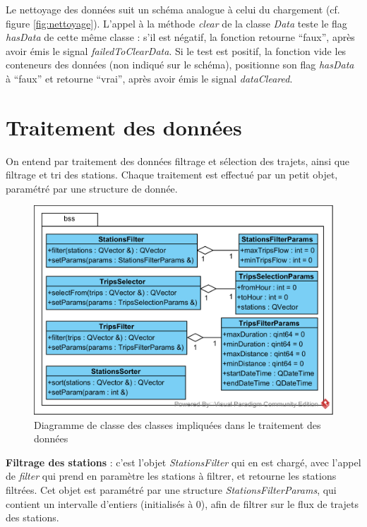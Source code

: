 \documentclass[12pt]{article}
\begin{document}
	Le nettoyage des données suit un schéma analogue à celui du chargement (cf. figure \ref{fig:nettoyage}). L’appel à la méthode \textit{clear} de la classe \textit{Data} teste le flag \textit{hasData} de cette même classe : s’il est négatif, la fonction retourne “faux”, après avoir émis le signal \textit{failedToClearData}. Si le test est positif, la fonction vide les conteneurs des données (non indiqué sur le schéma), positionne son flag \textit{hasData} à “faux” et retourne “vrai”, après avoir émis le signal \textit{dataCleared}.

\newpage
	\section{Traitement des données}
	On entend par traitement des données filtrage et sélection des trajets, ainsi que filtrage et tri des stations. Chaque traitement est effectué par un petit objet, paramétré par une structure de donnée.
	
	\begin{figure}[!h]
	\begin{center}
	\includegraphics[scale=1]{dia_class_filtres.png}
	\caption{Diagramme de classe des classes impliquées dans le traitement des données}
	\end{center}
	\end{figure}
	
	\textbf{Filtrage des stations} : c’est l’objet \textit{StationsFilter} qui en est chargé, avec l’appel de \textit{filter} qui prend en paramètre les stations à filtrer, et retourne les stations filtrées. Cet objet est paramétré par une structure \textit{StationsFilterParams}, qui contient un intervalle d’entiers (initialisés à 0), afin de filtrer sur le flux de trajets des stations.\\
\end{document}
